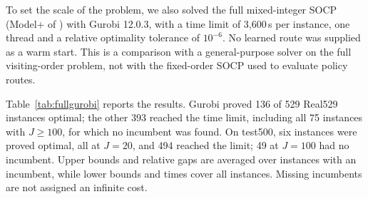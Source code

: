 \documentclass[preprint,12pt,authoryear]{elsarticle}
\begin{document}
To set the scale of the problem, we also solved the full mixed-integer SOCP (Model+ of \citet{li2025}) with Gurobi 12.0.3, with a time limit of 3,600\,s per instance, one thread and a relative optimality tolerance of $10^{-6}$. No learned route was supplied as a warm start. This is a comparison with a general-purpose solver on the full visiting-order problem, not with the fixed-order SOCP used to evaluate policy routes.

Table~\ref{tab:fullgurobi} reports the results. Gurobi proved 136 of 529 Real529 instances optimal; the other 393 reached the time limit, including all 75 instances with $J \ge 100$, for which no incumbent was found. On test500, six instances were proved optimal, all at $J = 20$, and 494 reached the limit; 49 at $J = 100$ had no incumbent. Upper bounds and relative gaps are averaged over instances with an incumbent, while lower bounds and times cover all instances. Missing incumbents are not assigned an infinite cost.

\begin{table}[t]
\centering
\caption{Full mixed-integer SOCP with a 3,600\,s limit and one thread. Opt. is the number proved optimal; Inc. is the number with a feasible incumbent. UB and relative solver gap $100(\mathrm{UB}-\mathrm{LB})/|\mathrm{UB}|$ are means over Inc. only. LB and solve time are means over all $n$ instances. A dash means no incumbent was found.}
\label{tab:fullgurobi}
\small
{}
\end{table}
\end{document}
